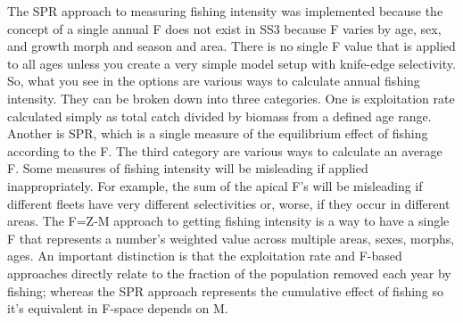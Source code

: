 The SPR approach to measuring fishing intensity was implemented because the concept of a single annual F does not exist in SS3 because F varies by age, sex, and growth morph and season and area. There is no single F value that is applied to all ages unless you create a very simple model setup with knife-edge selectivity. So, what you see in the options are various ways to calculate annual fishing intensity. They can be broken down into three categories.  One is exploitation rate calculated simply as total catch divided by biomass from a defined age range. Another is SPR, which is a single measure of the equilibrium effect of fishing according to the F. The third category are various ways to calculate an average F. Some measures of fishing intensity will be misleading if applied inappropriately. For example, the sum of the apical F's will be misleading if different fleets have very different selectivities or, worse, if they occur in different areas. The F=Z-M approach to getting fishing intensity is a way to have a single F that represents a number's weighted value across multiple areas, sexes, morphs, ages. An important distinction is that the exploitation rate and F-based approaches directly relate to the fraction of the population removed each year by fishing; whereas the SPR approach represents the cumulative effect of fishing so it's equivalent in F-space depends on M.

